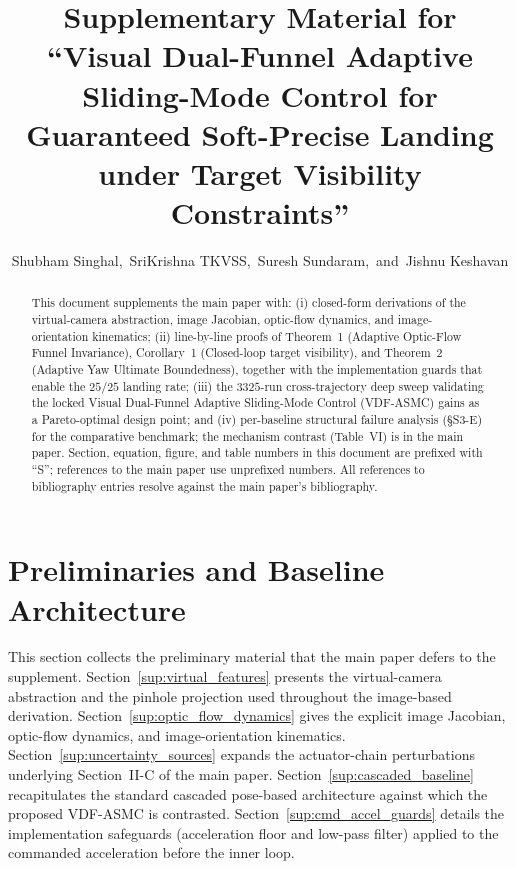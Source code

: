 \documentclass[10pt,journal]{IEEEtran}
\title{Supplementary Material for\\``Visual Dual-Funnel Adaptive Sliding-Mode Control for Guaranteed Soft-Precise Landing under Target Visibility Constraints''}
\author{Shubham Singhal,~SriKrishna TKVSS,~Suresh Sundaram,~and~Jishnu Keshavan}
\begin{document}
\maketitle

\begin{abstract}
This document supplements the main paper with: (i) closed-form derivations of the virtual-camera abstraction, image Jacobian, optic-flow dynamics, and image-orientation kinematics; (ii) line-by-line proofs of Theorem~1 (Adaptive Optic-Flow Funnel Invariance), Corollary~1 (Closed-loop target visibility), and Theorem~2 (Adaptive Yaw Ultimate Boundedness), together with the implementation guards that enable the $25/25$ landing rate; (iii) the $3325$-run cross-trajectory deep sweep validating the locked Visual Dual-Funnel Adaptive Sliding-Mode Control (VDF-ASMC) gains as a Pareto-optimal design point; and (iv) per-baseline structural failure analysis (\S S3-E) for the comparative benchmark; the mechanism contrast (Table~VI) is in the main paper. Section, equation, figure, and table numbers in this document are prefixed with ``S''; references to the main paper use unprefixed numbers. All references to bibliography entries resolve against the main paper's bibliography.
\end{abstract}

\section{Preliminaries and Baseline Architecture}
\label{sup:baseline}
This section collects the preliminary material that the main paper defers to the supplement. Section~\ref{sup:virtual_features} presents the virtual-camera abstraction and the pinhole projection used throughout the image-based derivation. Section~\ref{sup:optic_flow_dynamics} gives the explicit image Jacobian, optic-flow dynamics, and image-orientation kinematics. Section~\ref{sup:uncertainty_sources} expands the actuator-chain perturbations underlying Section~II-C of the main paper. Section~\ref{sup:cascaded_baseline} recapitulates the standard cascaded pose-based architecture against which the proposed VDF-ASMC is contrasted. Section~\ref{sup:cmd_accel_guards} details the implementation safeguards (acceleration floor and low-pass filter) applied to the commanded acceleration before the inner loop.
\end{document}
